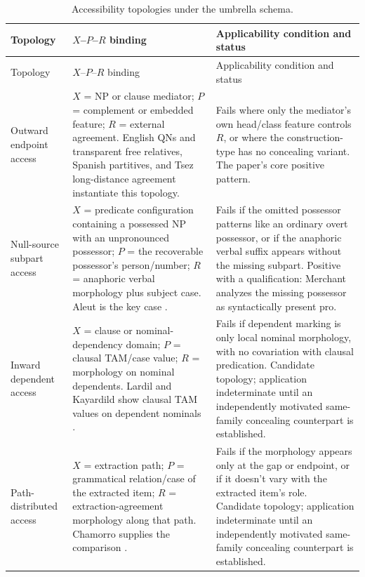 {
\begin{longtable}[]{@{}
  >{\raggedright\arraybackslash}p{}
  >{\raggedright\arraybackslash}p{}
  >{\raggedright\arraybackslash}p{}@{}}
\caption{Accessibility topologies under the umbrella schema.}\label{tab:topologies}\\
\toprule\noalign{}
Topology & $X$--$P$--$R$ binding & Applicability condition and status \\
\midrule\noalign{}
\endfirsthead
\toprule\noalign{}
Topology & $X$--$P$--$R$ binding & Applicability condition and status \\
\midrule\noalign{}
\endhead
\bottomrule\noalign{}
\endlastfoot
Outward endpoint access & $X$ = NP or clause mediator; $P$ = complement or embedded feature; $R$ = external agreement. English QNs and transparent free relatives, Spanish partitives, and Tsez long-distance agreement instantiate this topology. & Fails where only the mediator's own head/class feature controls $R$, or where the construction-type has no concealing variant. The paper's core positive pattern. \\
\addlinespace
Null-source subpart access & $X$ = predicate configuration containing a possessed NP with an unpronounced possessor; $P$ = the recoverable possessor's person/number; $R$ = anaphoric verbal morphology plus subject case. Aleut is the key case \autocite[195]{merchant-2011-aleut-case-matters}. & Fails if the omitted possessor patterns like an ordinary overt possessor, or if the anaphoric verbal suffix appears without the missing subpart. Positive with a qualification: Merchant analyzes the missing possessor as syntactically present pro. \\
\addlinespace
Inward dependent access & $X$ = clause or nominal-dependency domain; $P$ = clausal TAM/case value; $R$ = morphology on nominal dependents. Lardil and Kayardild show clausal TAM values on dependent nominals \autocite{nordlinger-sadler-2004-tense-beyond-verb}. & Fails if dependent marking is only local nominal morphology, with no covariation with clausal predication. Candidate topology; application indeterminate until an independently motivated same-family concealing counterpart is established. \\
\addlinespace
Path-distributed access & $X$ = extraction path; $P$ = grammatical relation/case of the extracted item; $R$ = extraction-agreement morphology along that path. Chamorro supplies the comparison \autocite{chung-1998-design-agreement,chung-2004-restructuring-chamorro}. & Fails if the morphology appears only at the gap or endpoint, or if it doesn't vary with the extracted item's role. Candidate topology; application indeterminate until an independently motivated same-family concealing counterpart is established. \\

\end{longtable}}
